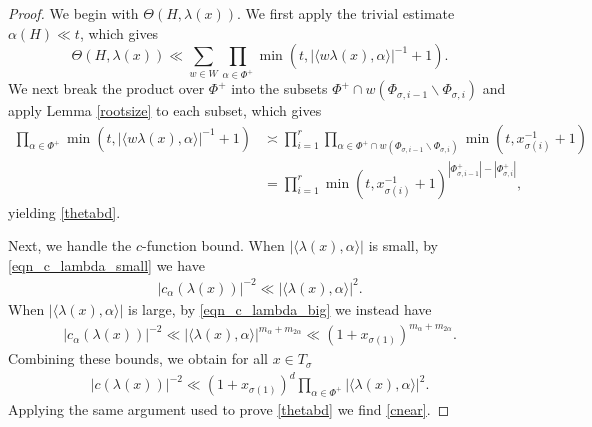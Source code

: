 \documentclass[12pt]{amsart}
\theoremstyle{remark}
\begin{document}
\begin{proof}
We begin with $\Theta(H, \lambda(x))$.  We first apply the trivial estimate $\alpha(H) \ll t$, which gives
\[
\Theta(H, \lambda(x)) \ll \sum_{w \in W} \prod_{\alpha \in \Phi^+} \min( t, | \langle w\lambda(x), \alpha \rangle |^{-1} +1).
\]
We next break the product over $\Phi^+$ into the subsets $\Phi^+ \cap w(\Phi_{\sigma, i-1} \smallsetminus \Phi_{\sigma, i})$ and apply Lemma \ref{rootsize} to each subset, which gives
\begin{align*}
\prod_{\alpha \in \Phi^+} \min( t, | \langle w\lambda(x), \alpha \rangle |^{-1} +1) & \asymp \prod_{i = 1}^r \prod_{\alpha \in \Phi^+ \cap w(\Phi_{\sigma, i-1} \smallsetminus \Phi_{\sigma, i}) } \min( t, x_{\sigma(i)}^{-1} +1) \\
& = \prod_{i = 1}^r \min( t, x_{\sigma(i)}^{-1} +1)^{ |\Phi_{\sigma, i-1}^+| - |\Phi_{\sigma, i}^+| },
\end{align*}
yielding \eqref{thetabd}.

Next, we handle the $c$-function bound. When $|\langle \lambda(x), \alpha \rangle|$ is small, by \eqref{eqn_c_lambda_small} we have
\begin{gather*}
    |c_\alpha(\lambda(x))|^{-2} \ll |\langle \lambda(x), \alpha \rangle|^2.
\end{gather*}
When $|\langle \lambda(x), \alpha \rangle|$ is large, by \eqref{eqn_c_lambda_big} we instead have
\begin{gather*}
    |c_\alpha(\lambda(x))|^{-2} \ll |\langle \lambda(x), \alpha \rangle|^{m_\alpha + m_{2 \alpha}} \ll (1 + x_{\sigma(1)})^{m_\alpha + m_{2 \alpha}}. 
\end{gather*}
Combining these bounds, we obtain for all $x\in T_{\sigma}$
\begin{gather*}
    |c(\lambda(x))|^{-2} \ll (1 + x_{\sigma(1)})^{d} \prod_{\alpha \in \Phi^+} |\langle \lambda(x), \alpha \rangle|^2.
\end{gather*}
Applying the same argument used to prove \eqref{thetabd} we find \eqref{cnear}.



\end{proof}
\end{document}
